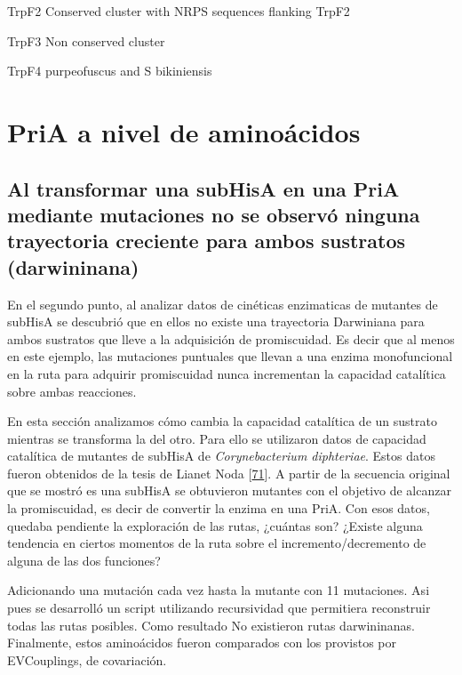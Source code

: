 \documentclass[12pt,twoside]{reedthesis}
\begin{document}
  TrpF2 Conserved cluster with NRPS sequences flanking TrpF2
  
  TrpF3 Non conserved cluster
  
  TrpF4 purpeofuscus and S bikiniensis
  
  \section{PriA a nivel de aminoácidos}\label{pria-a-nivel-de-aminoacidos}
  
  \subsection{Al transformar una subHisA en una PriA mediante mutaciones
  no se observó ninguna trayectoria creciente para ambos sustratos
  (darwininana)}\label{al-transformar-una-subhisa-en-una-pria-mediante-mutaciones-no-se-observo-ninguna-trayectoria-creciente-para-ambos-sustratos-darwininana}
  
  En el segundo punto, al analizar datos de cinéticas enzimaticas de
  mutantes de subHisA se descubrió que en ellos no existe una trayectoria
  Darwiniana para ambos sustratos que lleve a la adquisición de
  promiscuidad. Es decir que al menos en este ejemplo, las mutaciones
  puntuales que llevan a una enzima monofuncional en la ruta para adquirir
  promiscuidad nunca incrementan la capacidad catalítica sobre ambas
  reacciones.
  
  En esta sección analizamos cómo cambia la capacidad catalítica de un
  sustrato mientras se transforma la del otro. Para ello se utilizaron
  datos de capacidad catalítica de mutantes de subHisA de
  \emph{Corynebacterium diphteriae}. Estos datos fueron obtenidos de la
  tesis de Lianet Noda {[}\protect\hyperlink{ref-noda_tesis_2012}{71}{]}.
  A partir de la secuencia original que se mostró es una subHisA se
  obtuvieron mutantes con el objetivo de alcanzar la promiscuidad, es
  decir de convertir la enzima en una PriA. Con esos datos, quedaba
  pendiente la exploración de las rutas, ¿cuántas son? ¿Existe alguna
  tendencia en ciertos momentos de la ruta sobre el incremento/decremento
  de alguna de las dos funciones?
  
  Adicionando una mutación cada vez hasta la mutante con 11 mutaciones.
  Asi pues se desarrolló un script utilizando recursividad que permitiera
  reconstruir todas las rutas posibles. Como resultado No existieron rutas
  darwininanas. Finalmente, estos aminoácidos fueron comparados con los
  provistos por EVCouplings, de covariación.
  
\end{document}
